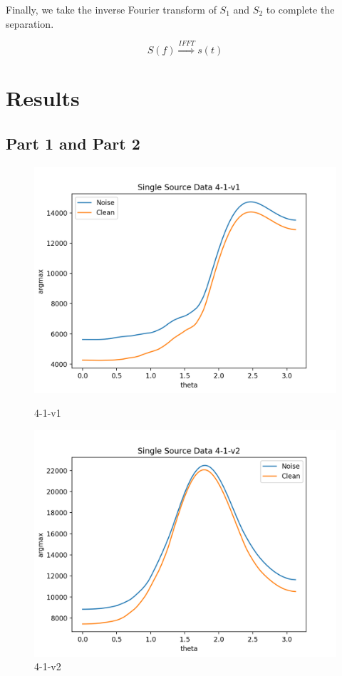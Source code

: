 \documentclass{article}
\begin{document}
        Finally, we take the inverse Fourier transform of $S_1$ and $S_2$ to complete the separation.

        $$
        S(f) \stackrel{IFFT}{\Longrightarrow} s(t)
        $$

    \section{Results}
        \subsection{Part 1 and Part 2}
        \begin{figure}[H]
            \centering
            \begin{minipage}{0.49\linewidth}
                \centering
                \includegraphics[width=0.9\linewidth]{pic/Figure_1.png}
                \caption{4-1-v1}
            \end{minipage}
            \begin{minipage}{0.49\linewidth}
                \centering
                \includegraphics[width=0.9\linewidth]{pic/Figure_2.png}
                \caption{4-1-v2}
            \end{minipage}
            

\end{figure}
\end{document}

